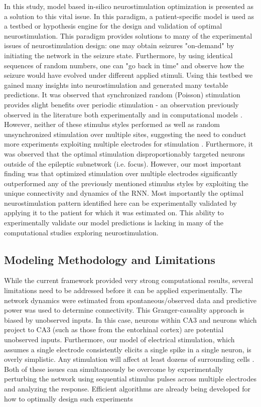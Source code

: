 \documentclass[11pt,a4paper,final]{article}
\begin{document}
In this study, model based in-silico neurostimulation optimization is presented as a solution to this vital issue.
In this paradigm, a patient-specific model is used as a testbed or hypothesis engine for the design and validation of optimal neurostimulation.
This paradigm provides solutions to many of the experimental issues of neurostimulation design: one may obtain seizures "on-demand" by initiating the network in the seizure state.
Furthermore, by using identical sequences of random numbers, one can "go back in time" and observe how the seizure would have evolved under different applied stimuli.
Using this testbed we gained many insights into neurostimulation and generated many testable predictions.
It was observed that synchronized random (Poisson) stimulation provides slight benefits over periodic stimulation - an observation previously observed in the literature both experimentally and in computational models \citep{wyckhuys10,buffel14}.
However, neither of these stimulus styles performed as well as random unsynchronized stimulation over multiple sites, suggesting the need to conduct more experiments exploiting multiple electrodes for stimulation \citep{cook13,van14}.
Furthermore, it was observed that the optimal stimulation disproportionably targeted neurons outside of the epileptic subnetwork (i.e. focus).
However, our most important finding was that optimized stimulation over multiple electrodes significantly outperformed any of the previously mentioned stimulus styles by exploiting the unique connectivity and dynamics of the RNN.
Most importantly the optimal neurostimulation pattern identified here can be experimentally validated by applying it to the patient for which it was estimated on.
This ability to experimentally validate our model predictions is lacking in many of the computational studies exploring neurostimulation.

\subsection{Modeling Methodology and Limitations}

While the current framework provided very strong computational results, several limitations need to be addressed before it can be applied experimentally.
The network dynamics were estimated from spontaneous/observed data and predictive power was used to determine connectivity.
This Granger-causality approach is biased by unobserved inputs.
In this case, neurons within CA3 and neurons which project to CA3 (such as those from the entorhinal cortex) are potential unobserved inputs.
Furthermore, our model of electrical stimulation, which assumes a single electrode consistently elicits a single spike in a single neuron, is overly simplistic.
Any stimulation will affect at least dozens of surrounding cells \citep{grill05,desai14}. 
Both of these issues can simultaneously be overcome by experimentally perturbing the network using sequential stimulus pulses across multiple electrodes and analyzing the response.
Efficient algorithms are already being developed for how to optimally design such experiments \citep{lepage13,kim14}
\end{document}
